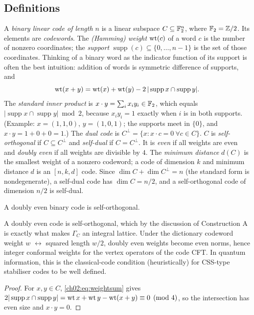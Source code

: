 \subsection{Definitions}

A \emph{binary linear code of length $n$} is a linear subspace $C\subseteq\mathbb{F}_2^n$, where
$\mathbb{F}_2={\mathbb{Z}}/2$.  Its elements are \emph{codewords}.  The \emph{(Hamming) weight}
$\operatorname{wt}(c)$ of a word $c$ is the number of nonzero coordinates; the \emph{support}
$\operatorname{supp}(c)\subseteq\{0,\dots,n-1\}$ is the set of those coordinates.  Thinking of a
binary word as the indicator function of its support is often the best intuition: addition of
words is symmetric difference of supports, and
\begin{equation}\label{ch02:eq:weightsum}
\operatorname{wt}(x+y)=\operatorname{wt}(x)+\operatorname{wt}(y)-2\,|\operatorname{supp}x\cap\operatorname{supp}y| .
\end{equation}
The \emph{standard inner product} is $x\cdot y=\sum_i x_iy_i\in\mathbb{F}_2$, which equals
$|\operatorname{supp}x\cap\operatorname{supp}y|\bmod2$, because $x_iy_i=1$ exactly when $i$ is in
both supports.  (Example: $x=(1,1,0)$, $y=(1,0,1)$; the supports meet in $\{0\}$, and $x\cdot
y=1+0+0=1$.)  The \emph{dual code} is
$C^\perp=\{x:x\cdot c=0\ \forall c\in C\}$.  $C$ is \emph{self-orthogonal} if $C\subseteq
C^\perp$ and \emph{self-dual} if $C=C^\perp$.  It is \emph{even} if all weights are even and
\emph{doubly even} if all weights are divisible by $4$.  The \emph{minimum distance} $d(C)$ is the
smallest weight of a nonzero codeword; a code of dimension $k$ and minimum distance $d$ is an
$[n,k,d]$ code.  Since $\dim C+\dim C^\perp=n$ (the standard form is nondegenerate), a
self-dual code has $\dim C=n/2$, and a self-orthogonal code of dimension $n/2$ is self-dual.

\begin{lemma}\label{ch02:lem:doublyeven}
A doubly even binary code is self-orthogonal.
\end{lemma}
\begin{physics}
A doubly even code is self-orthogonal, which by the discussion of Construction A is exactly what makes $\Gamma_C$ an integral lattice. Under the dictionary codeword weight $w$ $\leftrightarrow$ squared length $w/2$, doubly even weights become even norms, hence integer conformal weights for the vertex operators of the code CFT. In quantum information, this is the classical-code condition (heuristically) for CSS-type stabiliser codes to be well defined.
\end{physics}
\begin{proof}
For $x,y\in C$, \eqref{ch02:eq:weightsum} gives
$2|\operatorname{supp}x\cap\operatorname{supp}y|=\operatorname{wt} x+\operatorname{wt} y-\operatorname{wt}(x+y)\equiv0
\pmod4$, so the intersection has even size and $x\cdot y=0$.
\end{proof}

